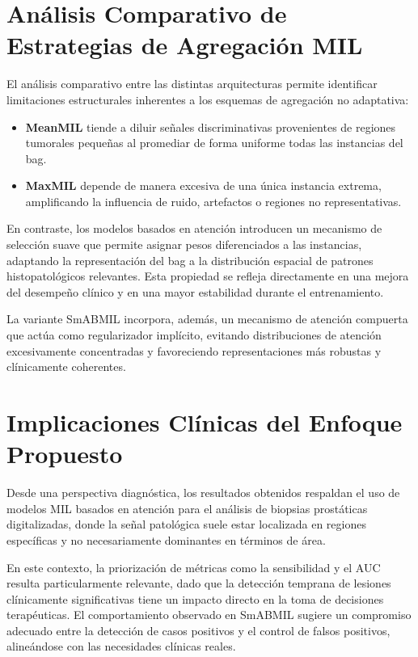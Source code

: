 \section{Análisis Comparativo de Estrategias de Agregación MIL}
El análisis comparativo entre las distintas arquitecturas permite identificar limitaciones estructurales inherentes a los esquemas de agregación no adaptativa:

\begin{itemize}
    \item \textbf{MeanMIL} tiende a diluir señales discriminativas provenientes de regiones tumorales pequeñas al promediar de forma uniforme todas las instancias del bag.
    \item \textbf{MaxMIL} depende de manera excesiva de una única instancia extrema, amplificando la influencia de ruido, artefactos o regiones no representativas.
\end{itemize}

En contraste, los modelos basados en atención introducen un mecanismo de selección suave que permite asignar pesos diferenciados a las instancias, adaptando la representación del bag a la distribución espacial de patrones histopatológicos relevantes. Esta propiedad se refleja directamente en una mejora del desempeño clínico y en una mayor estabilidad durante el entrenamiento.\newline

La variante SmABMIL incorpora, además, un mecanismo de atención compuerta que actúa como regularizador implícito, evitando distribuciones de atención excesivamente concentradas y favoreciendo representaciones más robustas y clínicamente coherentes.

\section{Implicaciones Clínicas del Enfoque Propuesto}
Desde una perspectiva diagnóstica, los resultados obtenidos respaldan el uso de modelos MIL basados en atención para el análisis de biopsias prostáticas digitalizadas, donde la señal patológica suele estar localizada en regiones específicas y no necesariamente dominantes en términos de área.\newline

En este contexto, la priorización de métricas como la sensibilidad y el AUC resulta particularmente relevante, dado que la detección temprana de lesiones clínicamente significativas tiene un impacto directo en la toma de decisiones terapéuticas. El comportamiento observado en SmABMIL sugiere un compromiso adecuado entre la detección de casos positivos y el control de falsos positivos, alineándose con las necesidades clínicas reales.\newline

